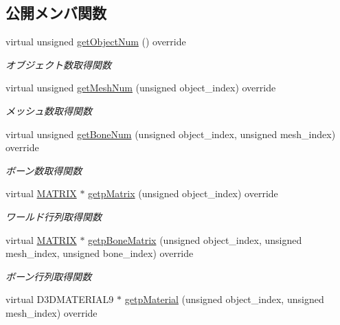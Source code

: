 \subsection*{公開メンバ関数}
\begin{DoxyCompactItemize}
\item 
virtual unsigned \mbox{\hyperlink{class_draw_null_a8bddfa6ee87e47b2ecbbe6803b088e37}{get\+Object\+Num}} () override
\begin{DoxyCompactList}\small\item\em オブジェクト数取得関数 \end{DoxyCompactList}\item 
virtual unsigned \mbox{\hyperlink{class_draw_null_a4c566a37d27fac3dcf76c7970443f375}{get\+Mesh\+Num}} (unsigned object\+\_\+index) override
\begin{DoxyCompactList}\small\item\em メッシュ数取得関数 \end{DoxyCompactList}\item 
virtual unsigned \mbox{\hyperlink{class_draw_null_a74aee63e6146b7256b80610abfb3eabb}{get\+Bone\+Num}} (unsigned object\+\_\+index, unsigned mesh\+\_\+index) override
\begin{DoxyCompactList}\small\item\em ボーン数取得関数 \end{DoxyCompactList}\item 
virtual \mbox{\hyperlink{_matrix_8h_a032295cd9fb1b711757c90667278e744}{M\+A\+T\+R\+IX}} $\ast$ \mbox{\hyperlink{class_draw_null_a9aac059eb3b5d1f77e8bd3aa0647cff9}{getp\+Matrix}} (unsigned object\+\_\+index) override
\begin{DoxyCompactList}\small\item\em ワールド行列取得関数 \end{DoxyCompactList}\item 
virtual \mbox{\hyperlink{_matrix_8h_a032295cd9fb1b711757c90667278e744}{M\+A\+T\+R\+IX}} $\ast$ \mbox{\hyperlink{class_draw_null_a9843abd940623bf84bbb0931f7e21af6}{getp\+Bone\+Matrix}} (unsigned object\+\_\+index, unsigned mesh\+\_\+index, unsigned bone\+\_\+index) override
\begin{DoxyCompactList}\small\item\em ボーン行列取得関数 \end{DoxyCompactList}\item 
virtual D3\+D\+M\+A\+T\+E\+R\+I\+A\+L9 $\ast$ \mbox{\hyperlink{class_draw_null_a0c1efe55fea325ad277594be6fe1e938}{getp\+Material}} (unsigned object\+\_\+index, unsigned mesh\+\_\+index) override

\end{DoxyCompactItemize}
